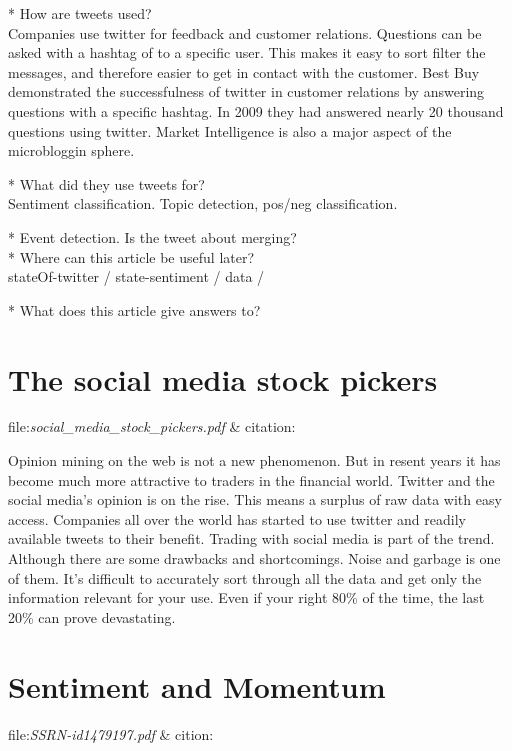 * How are tweets used?\\
Companies use twitter for feedback and customer relations. Questions can be
asked with a hashtag of to a specific user. This makes it easy to sort filter
the messages, and therefore easier to get in contact with the customer. Best
Buy demonstrated the successfulness of twitter in customer relations by
answering questions with a specific hashtag. In 2009 they had answered nearly
20 thousand questions using twitter. \cite[p1]{Li2013206}
Market Intelligence is also a major aspect of the microbloggin sphere. 

* What did they use tweets for?\\
Sentiment classification. Topic detection, pos/neg classification.  

* Event detection. Is the tweet about merging? \\
* Where can this article be useful later? \\
stateOf-twitter / state-sentiment /  data / 

* What does this article give answers to?\\

\section{The social media stock pickers}
file:\textit{social\_media\_stock\_pickers.pdf} & citation:\cite[]{stevenson12:social_media_stock_pickers}

Opinion mining on the web is not a new phenomenon. But in resent years it has
become much more attractive to traders in the financial world. Twitter and the
social media's opinion is on the rise. This means a surplus of raw data with
easy access. Companies all over the world has started to use twitter and
readily available tweets to their benefit. Trading with social media is part of
the trend. Although there are some drawbacks and shortcomings. Noise and
garbage is one of them. It's difficult to accurately sort through all the data
and get only the information relevant for your use. Even if your right 80\% of
the time, the last 20\% can prove devastating. \cite[]{stevenson12:social_media_stock_pickers}

\section{Sentiment and Momentum}\label{sentiment_and_momentum}
file:\textit{SSRN-id1479197.pdf} & cition:\cite[]{doukas10:sentiment_and_momentum}

